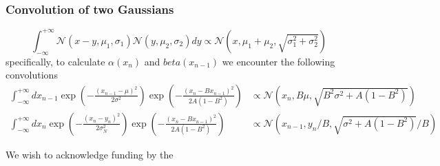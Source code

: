 \documentclass[%
 reprint,
 amsmath,amssymb,
 aps,
]{revtex4-1}
\begin{document}
\subsubsection{Convolution of two Gaussians}
\begin{equation}
\int_{-\infty}^{+\infty}\mathcal{N}(x-y,\mu_{1},\sigma_{1})\mathcal{N}(y,\mu_{2},\sigma_{2})dy
	\propto\mathcal{N}\left(x,\mu_{1}+\mu_{2},\sqrt{\sigma_{1}^2+\sigma_{2}^2}\right)
\end{equation}
specifically, to calculate $\alpha(x_{n})$ and $beta(x_{n-1})$ we encounter the following convolutions
\begin{equation}
	\begin{aligned}
	\int_{-\infty}^{+\infty}dx_{n-1}
	\exp \left( -\frac{{{{\left( {x_{n-1} - \mu} \right)}^2}}}{{2\sigma^{2}}} \right)
	\exp \left( -\frac{{{{\left( {x_{n} - Bx_{n-1}} \right)}^2}}}{{2A(1-B^{2})}} \right)
	&\propto \mathcal{N}\left(x_{n},B\mu,\sqrt{B^{2}\sigma^2+A(1-B^{2})}\right)\\
	\int_{-\infty}^{+\infty}dx_{n}
	\exp \left( -\frac{{{{\left( {x_{n} - y_{n}} \right)}^2}}}{{2\sigma_{N}^{2}}} \right)
	\exp \left( -\frac{{{{\left( {x_{n} - Bx_{n-1}} \right)}^2}}}{{2A(1-B^{2})}} \right)
	&\propto \mathcal{N}\left(x_{n-1},y_{n}/B,\sqrt{\sigma^2+A(1-B^{2})}/B\right)
	\end{aligned}
\end{equation}
\begin{acknowledgments}
We wish to acknowledge funding by the 
\end{acknowledgments}
\end{document}
